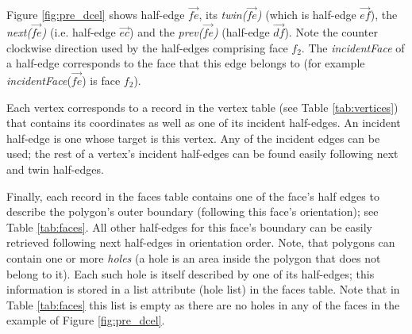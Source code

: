 Figure \ref{fig:pre_dcel} shows half-edge $\overrightarrow{fe}$, its \textit{twin($\overrightarrow{fe}$)} (which is half-edge $\overrightarrow{ef}$), the \textit{next($\overrightarrow{fe}$)} (i.e. half-edge $\overrightarrow{ec}$) and the \textit{prev($\overrightarrow{fe}$)} (half-edge $\overrightarrow{df}$). Note the counter clockwise direction used by the half-edges comprising face $f_2$. 
The \textit{incidentFace} of a half-edge corresponds to the face that this edge belongs to (for example \textit{incidentFace}($\overrightarrow{fe}$) is face $f_2$).

Each vertex corresponds to a record in the vertex table (see Table \ref{tab:vertices}) that contains its coordinates as well as one of its incident half-edges. An incident half-edge is one whose target is this vertex. Any of the incident edges can be used; the rest of a vertex's incident half-edges can be found easily following next and twin half-edges.

Finally, each record in the faces table contains one of the face's half edges to describe the polygon's outer boundary (following this face's orientation); see Table \ref{tab:faces}. 
All other half-edges for this face's boundary can be easily retrieved following next half-edges in orientation order.
Note, that polygons can contain one or more \textit{holes} (a hole is an area inside the polygon that does not belong to it). 
Each such hole is itself described by one of its half-edges; this information is stored in a list attribute (hole list) in the faces table. Note that in Table \ref{tab:faces} this list is empty as there are no holes in any of the faces in the example of Figure \ref{fig:pre_dcel}. 






